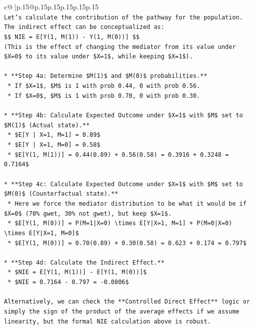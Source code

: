 \documentclass{article}
\begin{document}
{\begin{supertabular}{c@{$\;$}|p{.15\linewidth}@{}p{.15\linewidth}p{.15\linewidth}p{.15\linewidth}p{.15\linewidth}p{.15\linewidth}}
{{{\\ 
\texttt{Let's calculate the contribution of the pathway for the population.} \\
\texttt{The indirect effect can be conceptualized as:} \\
\texttt{\$\$ NIE = E{[}Y(1, M(1)) {-} Y(1, M(0)){]} \$\$} \\
\texttt{(This is the effect of changing the mediator from its value under \$X=0\$ to its value under \$X=1\$, while keeping \$X=1\$).} \\
\\ 
\texttt{*   **Step 4a: Determine \$M(1)\$ and \$M(0)\$ probabilities.**} \\
\texttt{    *   If \$X=1\$, \$M\$ is 1 with prob 0.44, 0 with prob 0.56.} \\
\texttt{    *   If \$X=0\$, \$M\$ is 1 with prob 0.70, 0 with prob 0.30.} \\
\\ 
\texttt{*   **Step 4b: Calculate Expected Outcome under \$X=1\$ with \$M\$ set to \$M(1)\$ (Actual state).**} \\
\texttt{    *   \$E{[}Y | X=1, M=1{]} = 0.89\$} \\
\texttt{    *   \$E{[}Y | X=1, M=0{]} = 0.58\$} \\
\texttt{    *   \$E{[}Y(1, M(1)){]} = 0.44(0.89) + 0.56(0.58) = 0.3916 + 0.3248 = 0.7164\$} \\
\\ 
\texttt{*   **Step 4c: Calculate Expected Outcome under \$X=1\$ with \$M\$ set to \$M(0)\$ (Counterfactual state).**} \\
\texttt{    *   Here we force the mediator distribution to be what it would be if \$X=0\$ (70\% gwet, 30\% not gwet), but keep \$X=1\$.} \\
\texttt{    *   \$E{[}Y(1, M(0)){]} = P(M=1|X=0) \textbackslash{}times E{[}Y|X=1, M=1{]} + P(M=0|X=0) \textbackslash{}times E{[}Y|X=1, M=0{]}\$} \\
\texttt{    *   \$E{[}Y(1, M(0)){]} = 0.70(0.89) + 0.30(0.58) = 0.623 + 0.174 = 0.797\$} \\
\\ 
\texttt{*   **Step 4d: Calculate the Indirect Effect.**} \\
\texttt{    *   \$NIE = E{[}Y(1, M(1)){]} {-} E{[}Y(1, M(0)){]}\$} \\
\texttt{    *   \$NIE = 0.7164 {-} 0.797 = {-}0.0806\$} \\
\\ 
\texttt{Alternatively, we can check the **Controlled Direct Effect** logic or simply the sign of the product of the average effects if we assume linearity, but the formal NIE calculation above is robust.} \\
}}}
\end{supertabular}}
\end{document}
